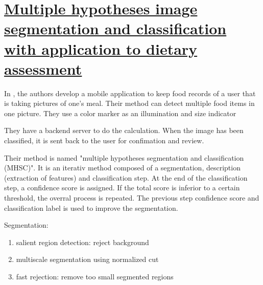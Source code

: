 \section{\href{http://ieeexplore.ieee.org/lpdocs/epic03/wrapper.htm?arnumber=6733271}{Multiple hypotheses image segmentation and classification with application to dietary assessment}}

In \cite{Zhu2015}, the authors develop a mobile application to keep food records of a user that is taking pictures of one's meal. Their method can detect multiple food items in one picture. They use a color marker as an illumination and size indicator

They have a backend server to do the calculation. When the image has been classified, it is sent back to the user for confimation and review.

Their method is  named "multiple hypotheses segmentation and classification (MHSC)". It is an iterativ method composed of a segmentation, description (extraction of features) and classification step.
At the end of the classification step, a confidence score is assigned. 
If the total score is inferior to a certain threshold, the overral process is repeated. The previous step confidence score and classification label is used to improve the segmentation.

Segmentation:
\begin{enumerate}
    \item salient region detection: reject background
    \item multiscale segmentation using normalized cut
    \item fast rejection: remove too small segmented regions
\end{enumerate}

